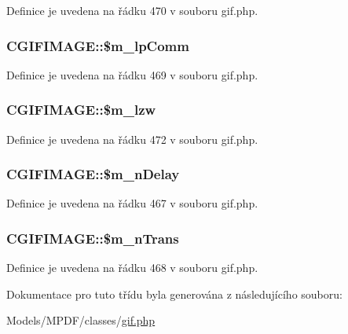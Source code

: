 Definice je uvedena na řádku 470 v souboru gif.\-php.

\hypertarget{class_c_g_i_f_i_m_a_g_e_a0b08fcd466245ffb621dca6ed967a0fb}{
\subsubsection[{\$m\-\_\-lp\-Comm}]{\setlength{\rightskip}{0pt plus 5cm}C\-G\-I\-F\-I\-M\-A\-G\-E\-::\$m\-\_\-lp\-Comm}}\label{class_c_g_i_f_i_m_a_g_e_a0b08fcd466245ffb621dca6ed967a0fb}


Definice je uvedena na řádku 469 v souboru gif.\-php.

\hypertarget{class_c_g_i_f_i_m_a_g_e_aca50c66ebd3f23df8b12b29432e5f040}{
\subsubsection[{\$m\-\_\-lzw}]{\setlength{\rightskip}{0pt plus 5cm}C\-G\-I\-F\-I\-M\-A\-G\-E\-::\$m\-\_\-lzw}}\label{class_c_g_i_f_i_m_a_g_e_aca50c66ebd3f23df8b12b29432e5f040}


Definice je uvedena na řádku 472 v souboru gif.\-php.

\hypertarget{class_c_g_i_f_i_m_a_g_e_a4ecb6918e71ecb426b4dd7533f4a45b7}{
\subsubsection[{\$m\-\_\-n\-Delay}]{\setlength{\rightskip}{0pt plus 5cm}C\-G\-I\-F\-I\-M\-A\-G\-E\-::\$m\-\_\-n\-Delay}}\label{class_c_g_i_f_i_m_a_g_e_a4ecb6918e71ecb426b4dd7533f4a45b7}


Definice je uvedena na řádku 467 v souboru gif.\-php.

\hypertarget{class_c_g_i_f_i_m_a_g_e_a412649e24b2194087854650448847765}{
\subsubsection[{\$m\-\_\-n\-Trans}]{\setlength{\rightskip}{0pt plus 5cm}C\-G\-I\-F\-I\-M\-A\-G\-E\-::\$m\-\_\-n\-Trans}}\label{class_c_g_i_f_i_m_a_g_e_a412649e24b2194087854650448847765}


Definice je uvedena na řádku 468 v souboru gif.\-php.



Dokumentace pro tuto třídu byla generována z následujícího souboru\-:\begin{DoxyCompactItemize}
\item 
Models/\-M\-P\-D\-F/classes/\hyperlink{gif_8php}{gif.\-php}\end{DoxyCompactItemize}
